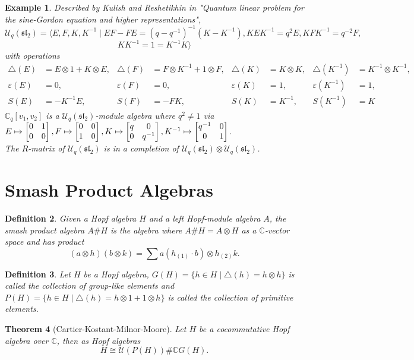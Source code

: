 \documentclass[12pt,a4paper]{article}
\newtheorem{theorem}{Theorem}[section]
\newtheorem{example}[theorem]{Example}
\newtheorem{definition}[theorem]{Definition}
\newcommand\1{_{(1)}}
\newcommand\2{_{(2)}}
\begin{document}
\begin{example}
Described by Kulish and Reshetikhin in "Quantum linear problem for the sine-Gordon equation and higher representations", 
\[
\mathcal{U}_q(\mathfrak{sl_2})=\langle E,F,K,K^{-1}\;\vert\; EF-FE=(q-q^{-1})^{-1}(K-K^{-1}), KEK^{-1}=q^2E, KFK^{-1}=q^{-2}F, \]\[KK^{-1}=1=K^{-1}K\rangle
\]
with operations
\begin{align*}
\triangle(E)&=E\otimes 1+K\otimes E, & \triangle(F)&=F\otimes K^{-1}+1\otimes F, & \triangle(K)&=K\otimes K, & \triangle(K^{-1})&=K^{-1}\otimes K^{-1},\\
\varepsilon(E)&=0, & \varepsilon(F)&=0, & \varepsilon(K)&=1, & \varepsilon(K^{-1})&=1,\\
S(E)&=-K^{-1}E, & S(F)&=-FK, & S(K)&=K^{-1}, & S(K^{-1})&=K
\end{align*}
$\mathbb{C}_q[v_1,v_2]$ is a $\mathcal{U}_q(\mathfrak{sl_2})$-module algebra where $q^2\neq 1$ via $E\mapsto \begin{bmatrix}0&1\\0&0\end{bmatrix}, F\mapsto \begin{bmatrix}0&0\\1&0\end{bmatrix}, \\K\mapsto \begin{bmatrix}q&0\\0&q^{-1}\end{bmatrix}, K^{-1}\mapsto\begin{bmatrix} q^{-1}&0\\0&1\end{bmatrix}$.
\\The $R$-matrix of $\mathcal{U}_q(\mathfrak{sl_2})$ is in a completion of $\mathcal{U}_q(\mathfrak{sl_2})\otimes \mathcal{U}_q(\mathfrak{sl_2})$.
\end{example}

\section{Smash Product Algebras}

\begin{definition}
Given a Hopf algebra $H$ and a left Hopf-module algebra $A$, the smash product algebra $A\# H$ is the algebra where $A\#H=A\otimes H$ as a $\mathbb{C}$-vector space and has product
\[
(a\otimes h)(b\otimes k)=\sum a(h\1\cdot b)\otimes h\2 k.
\]
\end{definition}

\begin{definition}
    Let $H$ be a Hopf algebra, $G(H)=\{h\in H\;\vert\; \triangle(h)=h\otimes h\}$ is called the collection of group-like elements and $P(H)=\{h\in H\;\vert\; \triangle(h)=h\otimes 1+1\otimes h\}$ is called the collection of primitive elements.
\end{definition}

\begin{theorem}[Cartier-Kostant-Milnor-Moore]
Let $H$ be a cocommutative Hopf algebra over $\mathbb{C}$, then as Hopf algebras
\[
H\cong \mathcal{U}(P(H))\# \mathbb{C}G(H).    
\]
\end{theorem}
\end{document}
